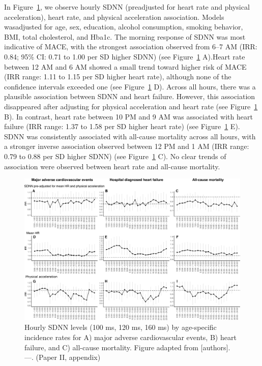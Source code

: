 \documentclass[
  a4paper,
  headsepline=true,
  open=any]{scrbook}
\begin{document}
In Figure~\ref{fig-ADD_PRO_risk_by_hour}, we observe hourly SDNN
(preadjusted for heart rate and physical acceleration), heart rate, and
physical acceleration association. Models wasadjusted for age, sex,
education, alcohol consumption, smoking behavior, BMI, total
cholesterol, and Hba1c. The morning response of SDNN was most indicative
of MACE, with the strongest association observed from 6--7 AM (IRR:
0.84; 95\% CI: 0.71 to 1.00 per SD higher SDNN) (see
Figure~\ref{fig-ADD_PRO_risk_by_hour} A).Heart rate between 12 AM and 6
AM showed a small trend toward higher risk of MACE (IRR range: 1.11 to
1.15 per SD higher heart rate), although none of the confidence
intervals exceeded one (see Figure~\ref{fig-ADD_PRO_risk_by_hour} D).
Across all hours, there was a plausible association between SDNN and
heart failure. However, this association disappeared after adjusting for
physical acceleration and heart rate (see
Figure~\ref{fig-ADD_PRO_risk_by_hour} B). In contrast, heart rate
between 10 PM and 9 AM was associated with heart failure (IRR range:
1.37 to 1.58 per SD higher heart rate) (see
Figure~\ref{fig-ADD_PRO_risk_by_hour} E). SDNN was consistently
associated with all-cause mortality across all hours, with a stronger
inverse association observed between 12 PM and 1 AM (IRR range: 0.79 to
0.88 per SD higher SDNN) (see Figure~\ref{fig-ADD_PRO_risk_by_hour} C).
No clear trends of association were observed between heart rate and
all-cause mortality.

\begin{figure}

{\centering \includegraphics{images/figure_ADD_PRO_risk_by_hour.pdf}

}

\caption{\label{fig-ADD_PRO_risk_by_hour}Hourly SDNN levels (100 ms, 120
ms, 160 ms) by age-specific incidence rates for A) major adverse
cardiovascular events, B) heart failure, and C) all-cause mortality.
Figure adapted from {[}authors{]}. ---. (Paper II, appendix)}

\end{figure}
\end{document}
